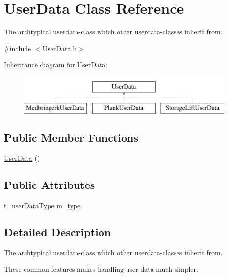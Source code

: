 \hypertarget{classUserData}{\section{User\-Data Class Reference}
\label{classUserData}
}


The archtypical userdata-\/class which other userdata-\/classes inherit from.  




{\ttfamily \#include $<$User\-Data.\-h$>$}

Inheritance diagram for User\-Data\-:\begin{figure}[H]
\begin{center}
\leavevmode
\includegraphics[height=2.000000cm]{classUserData}
\end{center}
\end{figure}
\subsection*{Public Member Functions}
\begin{DoxyCompactItemize}
\item 
\hyperlink{classUserData_a1d4f7b61ec5dd67bbd4e03efd4f85ce8}{User\-Data} ()
\end{DoxyCompactItemize}
\subsection*{Public Attributes}
\begin{DoxyCompactItemize}
\item 
\hyperlink{UserData_8h_a137995e5213a16d462ac7f64935fea34}{t\-\_\-user\-Data\-Type} \hyperlink{classUserData_acb084482d371d842c4ca1c6fc57f737d}{m\-\_\-type}
\end{DoxyCompactItemize}


\subsection{Detailed Description}
The archtypical userdata-\/class which other userdata-\/classes inherit from. 

These common features makes handling user-\/data much simpler. 

